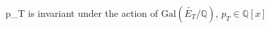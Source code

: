 \documentclass[preview]{standalone}
\begin{document}
\begin{center}
p_T is invariant under the action of $\text{Gal}\left(\widetilde{E_T}/\mathbb{Q}\right)$, $p_T \in \mathbb{Q}[x]$
\end{center}
\end{document}
